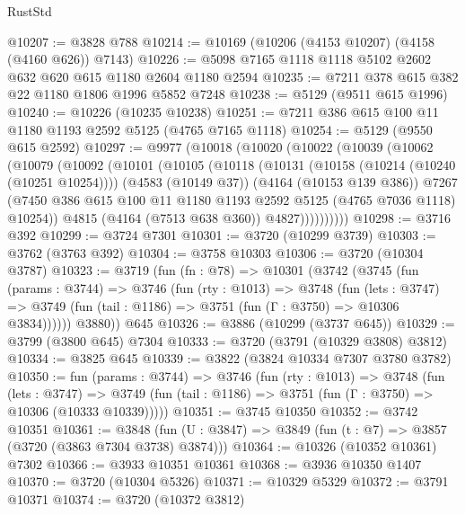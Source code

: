 \begin{lexlean}{RustStd}
\begin{coremodule}
@10207 := @3828 @788
@10214 := @10169 (@10206 (@4153 @10207) (@4158 (@4160 @626)) @7143)
@10226 := @5098 @7165 @1118 @1118 @5102 @2602 @632 @620 @615 @1180 @2604 @1180 @2594
@10235 := @7211 @378 @615 @382 @22 @1180 @1806 @1996 @5852 @7248
@10238 := @5129 (@9511 @615 @1996)
@10240 := @10226 (@10235 @10238)
@10251 := @7211 @386 @615 @100 @11 @1180 @1193 @2592 @5125 (@4765 @7165 @1118)
@10254 := @5129 (@9550 @615 @2592)
@10297 := @9977
    (@10018
      (@10020
        (@10022
          (@10039
            (@10062
              (@10079
                (@10092
                  (@10101
                    (@10105
                      (@10118
                        (@10131
                          (@10158 (@10214 (@10240 (@10251 @10254))))
                          (@4583 (@10149 @37))
                          (@4164 (@10153 @139 @386))
                          @7267
                          (@7450
                            @386
                            @615
                            @100
                            @11
                            @1180
                            @1193
                            @2592
                            @5125
                            (@4765 @7036 @1118)
                            @10254))
                        @4815
                        (@4164 (@7513 @638 @360))
                        @4827))))))))))
@10298 := @3716 @392
@10299 := @3724 @7301
@10301 := @3720 (@10299 @3739)
@10303 := @3762 (@3763 @392)
@10304 := @3758 @10303
@10306 := @3720 (@10304 @3787)
@10323 := @3719
    (fun (fn : @78) =>
    @10301
      (@3742
        (@3745
          (fun (params : @3744) =>
          @3746
            (fun (rty : @1013) =>
            @3748
              (fun (lets : @3747) =>
              @3749 (fun (tail : @1186) => @3751 (fun (Γ : @3750) => @10306 @3834))))))
        @3880))
    @645
@10326 := @3886 (@10299 (@3737 @645))
@10329 := @3799 (@3800 @645) @7304
@10333 := @3720 (@3791 (@10329 @3808) @3812)
@10334 := @3825 @645
@10339 := @3822 (@3824 @10334 @7307 @3780 @3782)
@10350 := fun (params : @3744) =>
  @3746
    (fun (rty : @1013) =>
    @3748
      (fun (lets : @3747) =>
      @3749 (fun (tail : @1186) => @3751 (fun (Γ : @3750) => @10306 (@10333 @10339)))))
@10351 := @3745 @10350
@10352 := @3742 @10351
@10361 := @3848 (fun (U : @3847) => @3849 (fun (t : @7) => @3857 (@3720 (@3863 @7304 @3738) @3874)))
@10364 := @10326 (@10352 @10361) @7302
@10366 := @3933 @10351 @10361
@10368 := @3936 @10350 @1407
@10370 := @3720 (@10304 @5326)
@10371 := @10329 @5329
@10372 := @3791 @10371
@10374 := @3720 (@10372 @3812)

\end{coremodule}
\end{lexlean}
